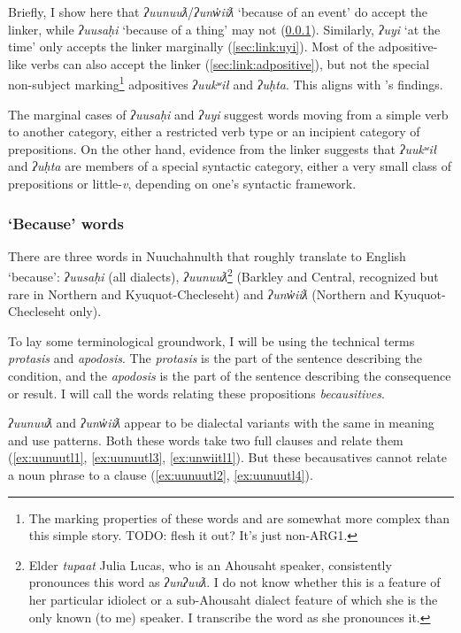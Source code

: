 Briefly, I show here that \textit{ʔuunuuƛ}/\textit{ʔunw̓iiƛ} `because of an event' do accept the linker, while \textit{ʔuusaḥi} `because of a thing' may not (\ref{sec:link:because}). Similarly, \textit{ʔuyi} `at the time' only accepts the linker marginally (\ref{sec:link:uyi}). Most of the adpositive-like verbs can also accept the linker (\ref{sec:link:adpositive}), but not the special non-subject marking\footnote{The marking properties of these words and are somewhat more complex than this simple story. TODO: flesh it out? It's just non-ARG1.} adpositives \textit{ʔuukʷił} and \textit{ʔuḥta}. This aligns with \citeauthor{woo2007b}'s findings.

The marginal cases of \textit{ʔuusaḥi} and \textit{ʔuyi} suggest words moving from a simple verb to another category, either a restricted verb type or an incipient category of prepositions. On the other hand, evidence from the linker suggests that \textit{ʔuukʷił} and \textit{ʔuḥta} are members of a special syntactic category, either a very small class of prepositions or little-\textit{v}, depending on one's syntactic framework.

\subsubsection{`Because' words} \label{sec:link:because}

There are three words in Nuuchahnulth that roughly translate to English `because': \textit{ʔuusaḥi} (all dialects), \textit{ʔuunuuƛ}\footnote{Elder \textit{tupaat} Julia Lucas, who is an Ahousaht speaker, consistently pronounces this word as \textit{ʔunʔuuƛ}. I do not know whether this is a feature of her particular idiolect or a sub-Ahousaht dialect feature of which she is the only known (to me) speaker. I transcribe the word as she pronounces it.} (Barkley and Central, recognized but rare in Northern and Kyuquot-Checleseht) and \textit{ʔunw̓iiƛ} (Northern and Kyuquot-Checleseht only).

To lay some terminological groundwork, I will be using the technical terms \textit{protasis} and \textit{apodosis}. The \textit{protasis} is the part of the sentence describing the condition, and the \textit{apodosis} is the part of the sentence describing the consequence or result. I will call the words relating these propositions \textit{becausitives}.

\textit{ʔuunuuƛ} and \textit{ʔunw̓iiƛ} appear to be dialectal variants with the same in meaning and use patterns. Both these words take two full clauses and relate them (\ref{ex:uunuutl1}, \ref{ex:uunuutl3}, \ref{ex:unwiitl1}). But these becausatives cannot relate a noun phrase to a clause (\ref{ex:uunuutl2}, \ref{ex:uunuutl4}).

